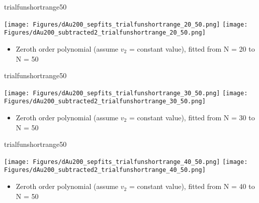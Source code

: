 \documentclass[aspectratio=169,compress,10pt]{beamer}
\begin{document}
\begin{frame}{trialfunshortrange50}
\begin{center}
\texttt{[image: Figures/dAu200\_sepfits\_trialfunshortrange\_20\_50.png]}
\texttt{[image: Figures/dAu200\_subtracted2\_trialfunshortrange\_20\_50.png]}
\end{center}
\begin{itemize}
\item Zeroth order polynomial (assume $v_2$ = constant value), fitted from N = 20 to N = 50
\end{itemize}
\end{frame}



\begin{frame}{trialfunshortrange50}
\begin{center}
\texttt{[image: Figures/dAu200\_sepfits\_trialfunshortrange\_30\_50.png]}
\texttt{[image: Figures/dAu200\_subtracted2\_trialfunshortrange\_30\_50.png]}
\end{center}
\begin{itemize}
\item Zeroth order polynomial (assume $v_2$ = constant value), fitted from N = 30 to N = 50
\end{itemize}
\end{frame}



\begin{frame}{trialfunshortrange50}
\begin{center}
\texttt{[image: Figures/dAu200\_sepfits\_trialfunshortrange\_40\_50.png]}
\texttt{[image: Figures/dAu200\_subtracted2\_trialfunshortrange\_40\_50.png]}
\end{center}
\begin{itemize}
\item Zeroth order polynomial (assume $v_2$ = constant value), fitted from N = 40 to N = 50
\end{itemize}
\end{frame}
\end{document}
